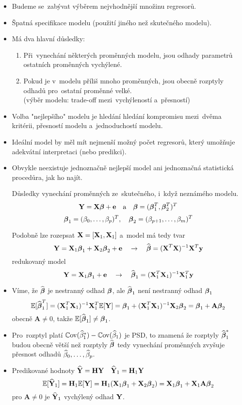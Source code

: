 \begin{itemize}
	\item Budeme se~zabývat výběrem nejvhodnější množinu regresorů.
	\item Špatná specifikace modelu (použití jiného než skutečného modelu).
	\item Má dva hlavní důsledky:
	\begin{enumerate}
		\item Při~vynechání některých proměnných modelu, jsou odhady parametrů ostatních proměnných vychýlené.
		\item Pokud je v~modelu příliš mnoho proměnných, jsou obecně rozptyly odhadů pro~ostatní proměnné velké. \\
		(výběr modelu: trade-off mezi~vychýleností a~přesností)
	\end{enumerate}
	\item Volba "nejlepšího" modelu je hledání hledání kompromisu mezi~dvěma kritérii, přesností modelu a~jednoduchostí modelu.
	\item Ideální model by měl mít nejmenší možný počet regresorů, který umožňuje adekvátní interpretaci (nebo predikci).
	\item Obvykle neexistuje jednoznačně nejlepší model ani jednoznačná statistická procedůra, jak ho najít.
	
	\begin{remark}
		Důsledky vynechání proměnných ze~skutečného, i~když neznámého modelu. \\
		$$
		\mathbf{Y} = \mathbf{X} \boldsymbol{\beta} + \mathbf{e}  \quad \text{a} \quad \boldsymbol{\beta} = (\boldsymbol{\beta}_1^T,\boldsymbol{\beta}_2^T)^T
		$$
		$$
		\boldsymbol{\beta}_1 = (\beta_0,\dots,\beta_p)^T, \quad \boldsymbol{\beta}_2 = (\beta_{p+1},\dots,\beta_m)^T
		$$
	\end{remark}
	Podobně lze rozepsat $ \mathbf{X} = [\mathbf{X}_1 , \mathbf{X}_1] $ a~model má tedy tvar
	$$
	\mathbf{Y} = \mathbf{X}_1 \boldsymbol{\beta}_1 + \mathbf{X}_2 \boldsymbol{\beta}_2 + \mathbf{e}  \quad \rightarrow \quad \widehat{\boldsymbol{\beta}} = {(\textbf{X}^T\textbf{X})^{-1}} \mathbf{X}^T \mathbf{y}
	$$
	redukovaný model
	$$
	\mathbf{Y} = \mathbf{X}_1 \boldsymbol{\beta}_1 + \mathbf{e}  \quad \rightarrow \quad \widehat{\boldsymbol{\beta}}_1 = {(\textbf{X}_1^T\textbf{X}_1)^{-1}} \mathbf{X}_1^T \mathbf{y}
		$$	
	\item Víme, že $ \widehat{\boldsymbol{\beta}} $ je nestranný odhad $ \boldsymbol{\beta} $, ale $ \widehat{\boldsymbol{\beta}}_1 $ není nestranný odhad $ \boldsymbol{\beta}_1 $
	$$
	\mathbb{E} [ \widehat{\boldsymbol{\beta}}_1^T ] = {(\textbf{X}_1^T\textbf{X}_1)^{-1}} \mathbf{X}_1^T \mathbb{E} [\mathbf{Y}] = \boldsymbol{\beta}_1 + {(\textbf{X}_1^T\textbf{X}_1)^{-1}} \mathbf{X}_2 \boldsymbol{\beta}_2 = \boldsymbol{\beta}_1 + \textbf{A} \boldsymbol{\beta}_2
	$$	
	obecně $ \textbf{A} \neq 0 $, takže $ \mathbb{E} [\widehat{\boldsymbol{\beta}}_1] \neq \boldsymbol{\beta}_1 $.
	\item Pro~rozptyl platí $ \mathbb{C}\mathrm{ov} ( \widehat{\beta}_1^*) - \mathbb{C}\mathrm{ov} ( \widehat{\beta}_1 ) $ je PSD, to znamená že rozptyly $ \widehat{\boldsymbol{\beta}}_1^* $ budou obecně větší než rozptyly $ \widehat{\boldsymbol{\beta}} $ tedy vynechání proměnných zvyšuje přesnost odhadů $ \widehat{\beta}_0,\dots,\widehat{\beta}_p $.
	\item Predikované hodnoty $ \widehat{\mathbf{Y}} = \textbf{H} \mathbf{Y} \quad \widehat{\mathbf{Y}}_1 = \textbf{H}_1 \mathbf{Y} $
	$$
	\mathbb{E} [\widehat{\mathbf{Y}}_1 ] = \textbf{H}_1 \mathbb{E} [ \mathbf{Y} ] = \textbf{H}_1 ( \mathbf{X}_1 \boldsymbol{\beta}_1 + \mathbf{X}_2 \boldsymbol{\beta}_2 ) = \mathbf{X}_1 \boldsymbol{\beta}_1 + \mathbf{X}_1 \textbf{A} \boldsymbol{\beta}_2
	$$
	pro $ \textbf{A} \neq 0 $ je $ \widehat{\mathbf{Y}}_1 $ vychýlený odhad $ \mathbf{Y} $.
\end{itemize}


